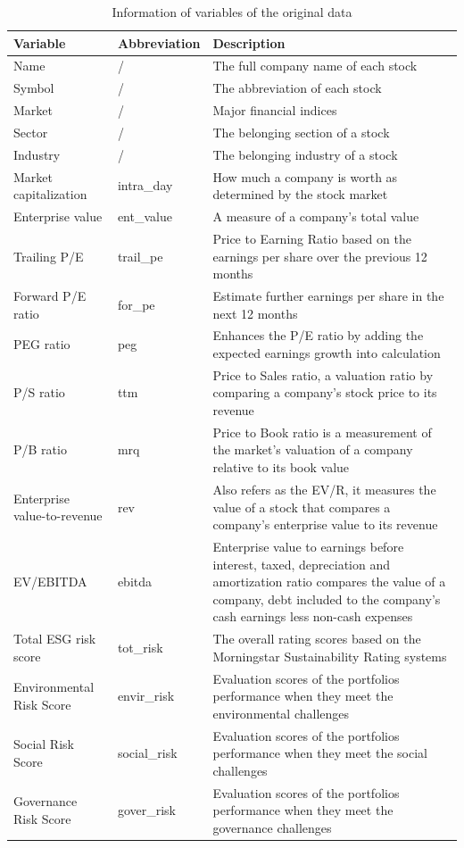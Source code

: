 \documentclass[11pt,a4paper,]{article}
\begin{document}
\begin{table}

\caption{\label{tab:variables-table}Information of variables of the original data}
\centering
\begin{tabular}[t]{l|l|>{\raggedright\arraybackslash}p{170px}}
\hline
Variable & Abbreviation & Description\\
\hline
Name & / & The full company name of each stock\\
\hline
Symbol & / & The abbreviation of each stock\\
\hline
Market & / & Major financial indices\\
\hline
Sector & / & The belonging section of a stock\\
\hline
Industry & / & The belonging industry of a stock\\
\hline
Market capitalization & intra\_day & How much a company is worth as determined by the stock market\\
\hline
Enterprise value & ent\_value & A measure of a company's total value\\
\hline
Trailing P/E & trail\_pe & Price to Earning Ratio based on the earnings per share over the previous 12 months\\
\hline
Forward P/E ratio & for\_pe & Estimate further earnings per share in the next 12 months\\
\hline
PEG ratio & peg & Enhances the P/E ratio by adding the expected earnings growth into calculation\\
\hline
P/S ratio & ttm & Price to Sales ratio, a valuation ratio by comparing a company’s stock price to its revenue\\
\hline
P/B ratio & mrq & Price to Book ratio is a measurement of the market's valuation of a company relative to its book value\\
\hline
Enterprise value-to-revenue & rev & Also refers as the EV/R, it measures the value of a stock that compares a company's enterprise value to its revenue\\
\hline
EV/EBITDA & ebitda & Enterprise value to earnings before interest, taxed, depreciation and amortization ratio compares the value of a company, debt included to the company's cash earnings less non-cash expenses\\
\hline
Total ESG risk score & tot\_risk & The overall rating scores based on the Morningstar Sustainability Rating systems\\
\hline
Environmental Risk Score & envir\_risk & Evaluation scores of the portfolios performance when they meet the environmental challenges\\
\hline
Social Risk Score & social\_risk & Evaluation scores of the portfolios performance when they meet the social challenges\\
\hline
Governance Risk Score & gover\_risk & Evaluation scores of the portfolios performance when they meet the governance challenges\\
\hline
\end{tabular}
\end{table}
\end{document}
